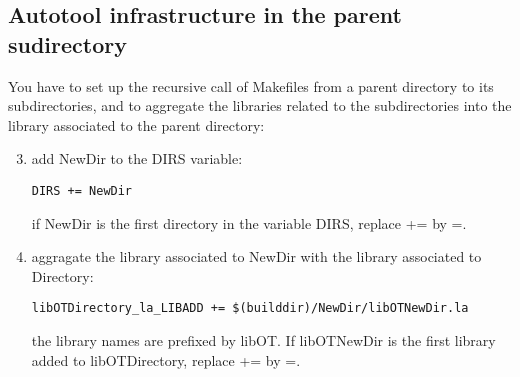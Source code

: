 \documentclass[11pt]{article}
\begin{document}
\subsection{Autotool infrastructure in the parent sudirectory}
You have to set up the recursive call of Makefiles from a parent directory to its subdirectories, and to aggregate the libraries related to the subdirectories into the library associated to the parent directory:
\begin{enumerate}
  \setcounter{enumi}{2}
\item add NewDir to the DIRS variable:
\begin{verbatim}
DIRS += NewDir
\end{verbatim}
  if NewDir is the first directory in the variable DIRS, replace += by =.
\item aggragate the library associated to NewDir with the library associated to Directory:
\begin{verbatim}
libOTDirectory_la_LIBADD += $(builddir)/NewDir/libOTNewDir.la
\end{verbatim}
  the library names are prefixed by libOT. If libOTNewDir is the first library added to libOTDirectory, replace += by =.
\end{enumerate}
\end{document}
